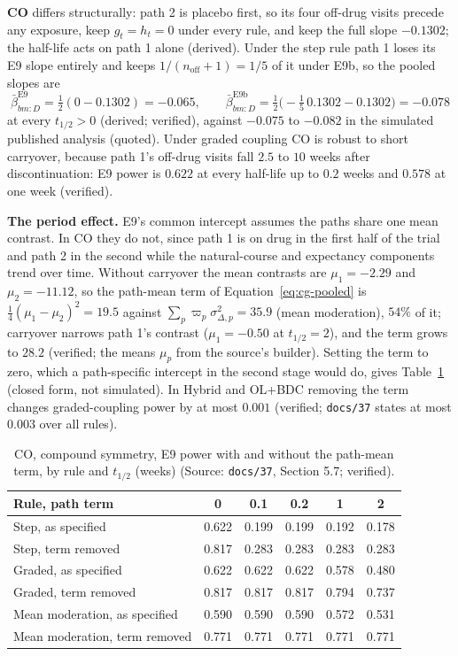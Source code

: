 \documentclass[11pt]{article}
\newcommand{\code}[1]{\texttt{#1}}
\begin{document}
\textbf{CO} differs structurally: path 2 is placebo first, so its four
off-drug visits precede any exposure, keep $g_t = h_t = 0$ under every
rule, and keep the full slope $-0.1302$; the half-life acts on path 1
alone (derived). Under the step rule path 1 loses its E9 slope entirely
and keeps $1/(n_{\mathrm{off}}+1) = 1/5$ of it under E9b, so the pooled
slopes are
\begin{equation}
\bar\beta_{bm:D}^{\mathrm{E9}} = \tfrac12(0 - 0.1302) = -0.065, \qquad
\bar\beta_{bm:D}^{\mathrm{E9b}} = \tfrac12\big(-\tfrac15\,0.1302
  - 0.1302\big) = -0.078
\label{eq:inve-co-step}
\end{equation}
at every $t_{1/2} > 0$ (derived; verified), against $-0.075$ to
$-0.082$ in the simulated published analysis (quoted). Under graded
coupling CO is robust to short carryover, because path 1's off-drug
visits fall $2.5$ to $10$ weeks after discontinuation: E9 power is
$0.622$ at every half-life up to $0.2$ weeks and $0.578$ at one week
(verified).

\textbf{The period effect.} E9's common intercept assumes the paths
share one mean contrast. In CO they do not, since path 1 is on drug in
the first half of the trial and path 2 in the second while the
natural-course and expectancy components trend over time. Without
carryover the mean contrasts are $\mu_1 = -2.29$ and $\mu_2 = -11.12$,
so the path-mean term of Equation~\eqref{eq:cg-pooled} is
$\tfrac14(\mu_1-\mu_2)^2 = 19.5$ against $\sum_p \varpi_p\sigma_{\Delta,p}^2 = 35.9$
(mean moderation), $54\%$ of it; carryover narrows path 1's contrast
($\mu_1 = -0.50$ at $t_{1/2} = 2$), and the term grows to $28.2$
(verified; the means $\mu_p$ from the source's builder). Setting the
term to zero, which a path-specific intercept in the second stage
would do, gives Table~\ref{tab:inve-co} (closed form, not simulated).
In Hybrid and OL+BDC removing the term changes graded-coupling power by
at most $0.001$ (verified; \code{docs/37} states at most $0.003$ over
all rules).

\begin{table}[h]
\centering\small
\caption{CO, compound symmetry, E9 power with and without the path-mean
term, by rule and $t_{1/2}$ (weeks) (Source: \code{docs/37}, Section
5.7; verified).}
\label{tab:inve-co}
\begin{tabular}{@{}lccccc@{}}
\toprule
Rule, path term & 0 & 0.1 & 0.2 & 1 & 2 \\
\midrule
Step, as specified        & 0.622 & 0.199 & 0.199 & 0.192 & 0.178 \\
Step, term removed        & 0.817 & 0.283 & 0.283 & 0.283 & 0.283 \\
Graded, as specified      & 0.622 & 0.622 & 0.622 & 0.578 & 0.480 \\
Graded, term removed      & 0.817 & 0.817 & 0.817 & 0.794 & 0.737 \\
Mean moderation, as specified & 0.590 & 0.590 & 0.590 & 0.572 & 0.531 \\
Mean moderation, term removed & 0.771 & 0.771 & 0.771 & 0.771 & 0.771 \\
\bottomrule
\end{tabular}
\end{table}
\end{document}
